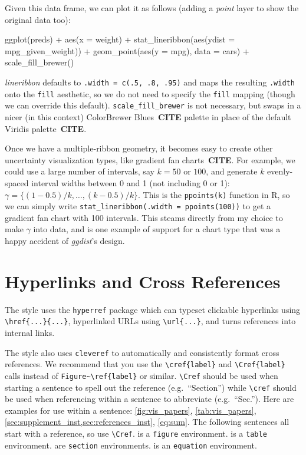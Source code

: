 \documentclass[journal]{vgtc}                     %
\newenvironment{centerverbatim}{%
  \hfill\break
  \centering
  \varwidth{\linewidth}%
  \verbatim
}{%
  \endverbatim
  \endvarwidth
  \par
  \hfill\break
}
\begin{document}
Given this data frame, we can plot it as follows (adding a \textit{point} layer to show the original data too):

\begin{centerverbatim}
ggplot(preds) +
  aes(x = weight) +
  stat_lineribbon(aes(ydist = mpg_given_weight)) +
  geom_point(aes(y = mpg), data = cars) +
  scale_fill_brewer()
\end{centerverbatim}

\textit{lineribbon} defaults to \texttt{.width = c(.5, .8, .95)} and maps the resulting \texttt{.width} onto the \texttt{fill} aesthetic, so we do not need to specify the \texttt{fill} mapping (though we can override this default). \texttt{scale\_fill\_brewer} is not necessary, but swaps in a nicer (in this context) ColorBrewer Blues~\textbf{CITE} palette in place of the default Viridis palette~\textbf{CITE}.

Once we have a multiple-ribbon geometry, it becomes easy to create other uncertainty visualization types, like gradient fan charts~\textbf{CITE}. For example, we could use a large number of intervals, say $k = 50$ or $100$, and generate $k$  evenly-spaced interval widths between 0 and 1 (not including 0 or 1): $\gamma = \{(1 - 0.5)/k, \dots, (k - 0.5)/k\}$. This is the \texttt{ppoints(k)} function in R, so we can simply write \texttt{stat\_lineribbon(.width = ppoints(100))} to get a gradient fan chart with 100 intervals. This steams directly from my choice to make $\gamma$ into data, and is one example of support for a chart type that was a happy accident of \textit{ggdist}'s design.

 
\section{Hyperlinks and Cross References}

The style uses the \verb|hyperref| package which can typeset clickable hyperlinks using \verb|\href{...}{...}|, hyperlinked URLs using \verb|\url{...}|, and turns references into internal links.

The style also uses \verb|cleveref| to automatically and consistently format cross references.
We recommend that you use the \verb|\cref{label}| and \verb|\Cref{label}| calls instead of \verb|Figure~\ref{label}| or similar.
\verb|\Cref| should be used when starting a sentence to spell out the reference (e.g.\ ``Section'') while \verb|\cref| should be used when referencing within a sentence to abbreviate (e.g.\ ``Sec.'').
Here are examples for use within a sentence: \cref{fig:vis_papers}, \cref{tab:vis_papers}, \cref{sec:supplement_inst,sec:references_inst}, \cref{eq:sum}.
The following sentences all start with a reference, so use \verb|\Cref|.
 is a \verb|figure| environment.
 is a \verb|table| environment.
 are \verb|section| environments.
 is an \verb|equation| environment.
\end{document}
